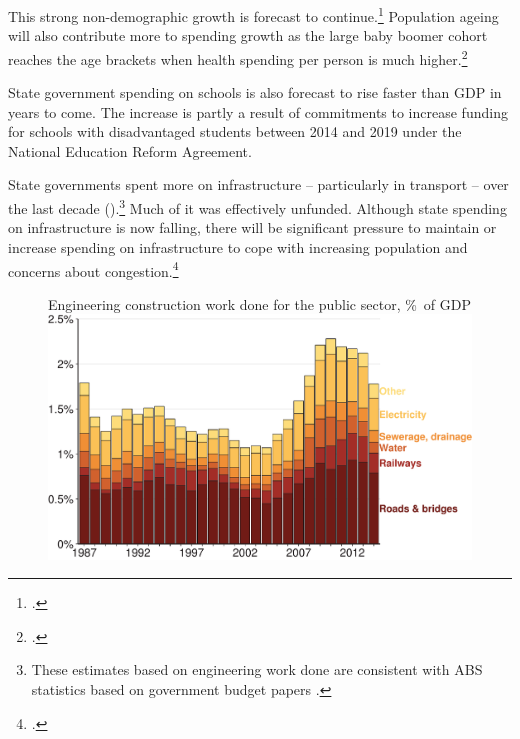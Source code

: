 \documentclass[twoside,english]{grattanBudgetRepairb5portrait}
\begin{document}
This strong non-demographic growth is forecast to continue.\footcite{ProductivityCommission2013AgeingAustralia}  Population ageing will also contribute more to spending growth as the large baby boomer cohort reaches the age brackets when health spending per person is much higher.\footcite[][26]{DaleyWoodWeidmannEtAl2014}  

State government spending on schools is also forecast to rise faster than GDP in years to come. The increase is partly a result of commitments to increase funding for schools with disadvantaged students between 2014 and 2019 under the National Education Reform Agreement.  

State governments spent more on infrastructure – particularly in transport – over the last decade ().\footnote{These estimates based on engineering work done are consistent with ABS statistics based on government budget papers \textcite[][41]{PBO2015a}.}  Much of it was effectively unfunded. Although state spending on infrastructure is now falling, there will be significant pressure to maintain or increase spending on infrastructure to cope with increasing population and concerns about congestion.\footcites[][112-128]{KellyDonegan2015}{InfrastructureAustralia2015-InfrastructureAudit}

\begin{figure}
%
{Engineering construction work done for the public sector, \%\ of GDP}
\includegraphics[width=1.1\columnwidth]{Fiscal-challenges/figure/Figure14-1.pdf}

\end{figure}
\end{document}
